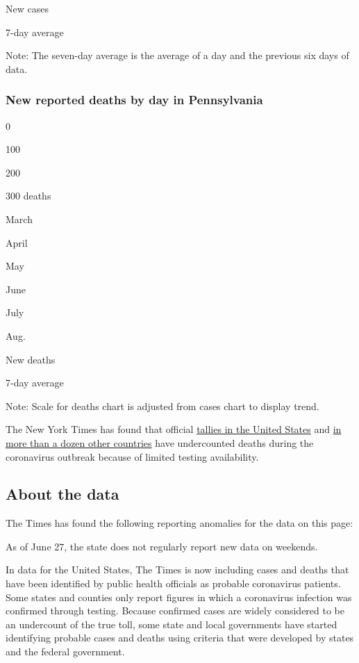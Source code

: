 New cases

7-day average

Note: The seven-day average is the average of a day and the previous six
days of data.

\hypertarget{new-reported-deaths-by-day-in-pennsylvania}{%
\subsubsection{New reported deaths by day in
Pennsylvania}\label{new-reported-deaths-by-day-in-pennsylvania}}

0

100

200

300 deaths

March

April

May

June

July

Aug.

New deaths

7-day average

Note: Scale for deaths chart is adjusted from cases chart to display
trend.

The New York Times has found that official
\href{https://www.nytimes.com/interactive/2020/04/28/us/coronavirus-death-toll-total.html}{tallies
in the United States} and
\href{https://www.nytimes.com/interactive/2020/04/21/world/coronavirus-missing-deaths.html}{in
more than a dozen other countries} have undercounted deaths during the
coronavirus outbreak because of limited testing availability.

\hypertarget{about-the-data}{%
\subsection{About the data}\label{about-the-data}}

The Times has found the following reporting anomalies for the data on
this page:

As of June 27, the state does not regularly report new data on weekends.

In data for the United States, The Times is now including cases and
deaths that have been identified by public health officials as probable
coronavirus patients. Some states and counties only report figures in
which a coronavirus infection was confirmed through testing. Because
confirmed cases are widely considered to be an undercount of the true
toll, some state and local governments have started identifying probable
cases and deaths using criteria that were developed by states and the
federal government.

